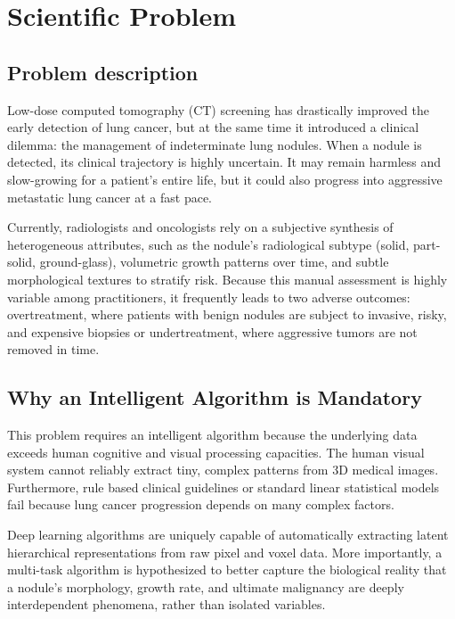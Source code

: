 \chapter{Scientific Problem}
\label{section:scientificProblem}
\section{Problem description}
\label{section:problemDescription}
Low-dose computed tomography (CT) screening has drastically improved the early
detection of lung cancer, but at the same time it introduced a clinical
dilemma: the management of indeterminate lung nodules. When a nodule is
detected, its clinical trajectory is highly uncertain. It may remain harmless
and slow-growing for a patient's entire life, but it could also progress into
aggressive metastatic lung cancer at a fast pace.

Currently, radiologists and oncologists rely on a subjective synthesis of heterogeneous attributes, such as the nodule's radiological subtype (solid, part-solid, ground-glass), volumetric growth patterns over time, and subtle morphological textures to stratify risk. Because this manual assessment is highly variable among practitioners, it frequently leads to two adverse outcomes: overtreatment, where patients with benign nodules are subject to invasive, risky, and expensive biopsies or undertreatment, where aggressive tumors are not removed in time.

\section{Why an Intelligent Algorithm is Mandatory}
\label{section:whyAnIntelligentAlgorithmIsMandatory}
This problem requires an intelligent algorithm because the underlying data exceeds human cognitive and visual processing capacities. The human visual system cannot reliably extract tiny, complex patterns from 3D medical images. Furthermore, rule based clinical guidelines or standard linear statistical models fail because lung cancer progression depends on many complex factors.

Deep learning algorithms are uniquely capable of automatically extracting latent hierarchical representations from raw pixel and voxel data. More importantly, a multi-task algorithm is hypothesized to better capture the
biological reality that a nodule's morphology, growth rate, and ultimate malignancy are deeply interdependent phenomena, rather than isolated variables.

